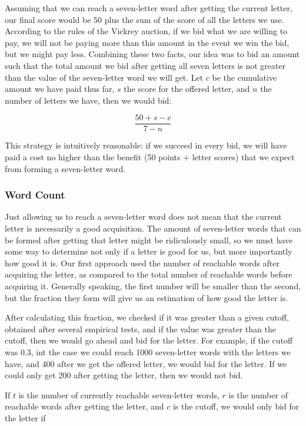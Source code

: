 \documentclass[11pt]{article}
\begin{document}
Assuming that we can reach a seven-letter word after getting the current letter, our final score would be 50 plus the sum of the score of all the letters we use. According to the rules of the Vickrey auction, if we bid what we are willing to pay, we will not be paying more than this amount in the event we win the bid, but we might pay less. Combining these two facts, our idea was to bid an amount such that the total amount we bid after getting all seven letters is not greater than the value of the seven-letter word we will get. Let $c$ be the cumulative amount we have paid thus far, $s$ the score for the offered letter, and $n$ the number of letters we have, then we would bid:

$$\frac{50+s-c}{7-n}$$

This strategy is intuitively reasonable: if we succeed in every bid, we will have paid a cost no higher than the benefit (50 points + letter scores) that we expect from forming a seven-letter word.

\subsubsection{Word Count}

Just allowing us to reach a seven-letter word does not mean that the current letter is necessarily a good acquisition. The amount of seven-letter words that can be formed after getting that letter might be ridiculously small, so we must have some way to determine not only if a letter is good for us, but more importantly how good it is. Our first approach used the number of reachable words after acquiring the letter, as compared to the total number of reachable words before acquiring it. Generally speaking, the first number will be smaller than the second, but the fraction they form will give us an estimation of how good the letter is.

After calculating this fraction, we checked if it was greater than a given cutoff, obtained after several empirical tests, and if the value was greater than the cutoff, then we would go ahead and bid for the letter. For example, if the cutoff was 0.3, int the case we could reach 1000 seven-letter words with the letters we have, and 400 after we get the offered letter, we would bid for the letter. If we could only get 200 after getting the letter, then we would not bid. 

If $t$ is the number of currently reachable seven-letter words, $r$ is the number of reachable words after getting the letter, and $c$ is the cutoff, we would only bid for the letter if
\end{document}
